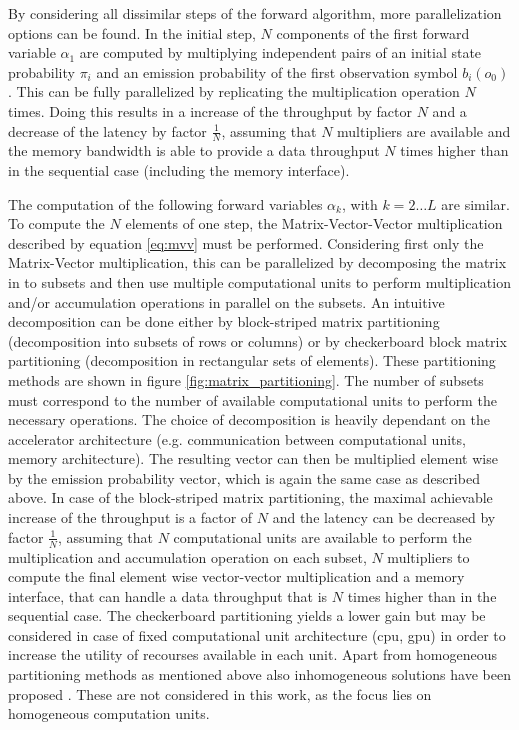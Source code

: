 \documentclass[mscthesis]{usiinfthesis}
\begin{document}
By considering all dissimilar steps of the forward algorithm, more
parallelization options can be found. In the initial step, $N$ components of
the first forward variable $\alpha_1$ are computed by multiplying independent
pairs of an initial state probability $\pi_i$ and an emission probability of
the first observation symbol $b_i(o_0)$. This can be fully parallelized by
replicating the multiplication operation $N$ times. Doing this results in
a increase of the throughput by factor $N$ and a decrease of the latency by
factor $\frac{1}{N}$, assuming that $N$ multipliers are available and the
memory bandwidth is able to provide a data throughput $N$ times higher than in
the sequential case (including the memory interface).

The computation of the following forward variables $\alpha_k$, with $k
= 2 \dots L$ are similar. To compute the $N$ elements of one step, the
Matrix-Vector-Vector multiplication described by equation \ref{eq:mvv} must be
performed. Considering first only the Matrix-Vector multiplication, this can be
parallelized by decomposing the matrix in to subsets and then use multiple
computational units to perform multiplication and/or accumulation operations in
parallel on the subsets. An intuitive decomposition can be done either by
block-striped matrix partitioning (decomposition into subsets of rows or
columns) or by checkerboard block matrix partitioning (decomposition in
rectangular sets of elements). These partitioning methods are shown in figure
\ref{fig:matrix_partitioning}. The number of subsets must correspond to the
number of available computational units to perform the necessary operations.
The choice of decomposition is heavily dependant on the accelerator
architecture (e.g.  communication between computational units, memory
architecture). The resulting vector can then be multiplied element wise by the
emission probability vector, which is again the same case as described above.
In case of the block-striped matrix partitioning, the maximal achievable
increase of the throughput is a factor of $N$ and the latency can be decreased
by factor $\frac{1}{N}$, assuming that $N$ computational units are available to
perform the multiplication and accumulation operation on each subset, $N$
multipliers to compute the final element wise vector-vector multiplication and
a memory interface, that can handle a data throughput that is $N$ times higher
than in the sequential case. The checkerboard partitioning yields a lower gain
but may be considered in case of fixed computational unit architecture (\gls{cpu},
\gls{gpu}) in order to increase the utility of recourses available in each unit.
Apart from homogeneous partitioning methods as mentioned above also
inhomogeneous solutions have been proposed \cite{IPDPSW12_DeFlumere, clarke11}.
These are not considered in this work, as the focus lies on homogeneous
computation units.
\end{document}
